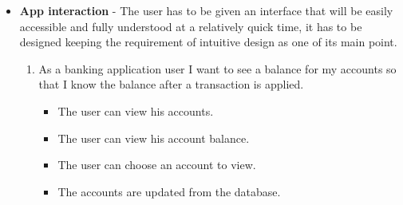 \begin{itemize}
        
    \item  \textbf{App interaction} - The user has to be given an interface that will be easily accessible and fully understood at a relatively quick time, it has to be designed keeping the requirement of intuitive design as one of its main point.
        \begin{enumerate}
        \item As a banking application user I want to see a balance for my accounts so that I know the balance after a transaction is applied. \cite{userStories}
            \begin{itemize}
                \item The user can view his accounts.
                \item The user can view his account balance.
                \item The user can choose an account to view.
                \item The accounts are updated from the database.


\end{itemize}
\end{enumerate}
\end{itemize}
